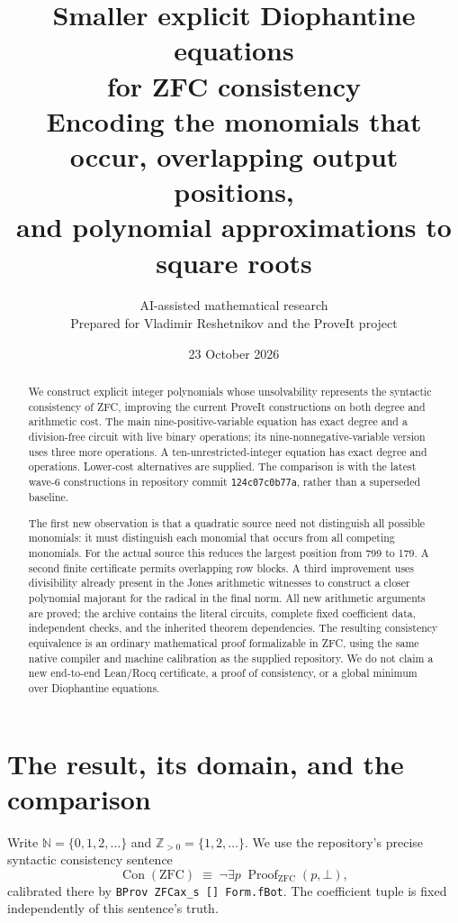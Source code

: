 \documentclass[11pt]{article}
\title{\color{ink}Smaller explicit Diophantine equations\\for ZFC consistency\\[0.7em]
\large Encoding the monomials that occur, overlapping output positions,\\and polynomial approximations to square roots}
\author{AI-assisted mathematical research\\Prepared for Vladimir Reshetnikov and the ProveIt project}
\date{23 October 2026}
\newcommand{\N}{\mathbb N}
\newcommand{\Pos}{\mathbb Z_{>0}}
\newcommand{\Con}{\operatorname{Con}}
\theoremstyle{definition}\newtheorem{definition}[theorem]{Definition}
\theoremstyle{remark}\newtheorem{remark}[theorem]{Remark}
\begin{document}
\maketitle
\begin{abstract}
We construct explicit integer polynomials whose unsolvability represents
the syntactic consistency of ZFC, improving the current ProveIt constructions
on both degree and arithmetic cost. The main nine-positive-variable equation
has exact degree \NineBestDegree{} and a division-free circuit with
\NineBestOps{} live binary operations; its nine-nonnegative-variable version
uses three more operations. A ten-unrestricted-integer equation has exact
degree \TenBestDegree{} and \TenBestOps{} operations. Lower-cost alternatives
are supplied. The comparison is with the latest wave-6 constructions in
repository commit \texttt{124c07c0b77a}, rather than a superseded baseline.

The first new observation is that a quadratic source need not distinguish
all possible monomials: it must distinguish each monomial that occurs from
all competing monomials. For the actual source this reduces the largest
position from 799 to 179. A second finite certificate permits overlapping
row blocks. A third improvement uses divisibility already present in the
Jones arithmetic witnesses to construct a closer polynomial majorant for
the radical in the final norm. All new arithmetic arguments are proved;
the archive contains the literal circuits, complete fixed coefficient data,
independent checks, and the inherited theorem dependencies. The resulting
consistency equivalence is an ordinary mathematical proof formalizable in
ZFC, using the same native compiler and machine calibration as the supplied
repository. We do not claim a new end-to-end Lean/Rocq certificate, a proof of
consistency, or a global minimum over Diophantine equations.
\end{abstract}
\newpage
\tableofcontents
\newpage

\section{The result, its domain, and the comparison}
\label{sec:result}
Write $\N=\{0,1,2,\ldots\}$ and $\Pos=\{1,2,\ldots\}$.
We use the repository's precise syntactic consistency sentence
\[
 \Con(\mathrm{ZFC})\;\equiv\;
 \neg\exists p\;\operatorname{Proof}_{\mathrm{ZFC}}(p,\bot),
\]
calibrated there by \texttt{BProv ZFCax\_s [] Form.fBot}.
The coefficient tuple is fixed independently of this sentence's truth.
\end{document}
